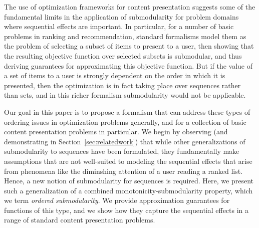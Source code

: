 The use of optimization frameworks for content presentation
suggests some of the fundamental limits in the application of submodularity
for problem domains where sequential effects are important.
In particular, for a number of basic problems in ranking and recommendation,
standard formalisms model them as the problem of selecting
a subset of items to present to a user, then showing that
the resulting objective function over selected subsets is
submodular, and thus deriving guarantees for
approximating this objective function.
But if the value of a set of items to a user is strongly
dependent on the order in which it is presented, 
then the optimization is in fact taking place over sequences rather
than sets, and in this richer formalism submodularity would not
be applicable.

Our goal in this paper is to propose a formalism that can address 
these types of ordering issues in optimization problems generally,
and for a collection of basic content presentation problems in particular.
We begin by observing (and demonstrating in Section~\ref{sec:relatedwork})
that while other generalizations of submodularity to sequences 
have been formulated, they fundamentally make assumptions that are not
well-suited to modeling the sequential effects that arise from
phenomena like the diminshing attention of a user reading a ranked list.
Hence, a new notion of
submodularity for sequences is required. Here, we present such a
generalization of a combined monotonicity-submodularity property,
which we term \emph{ordered submodularity}.
We provide approximation guarantees for functions of this type,
and we show how they capture the sequential effects in a
range of standard content presentation problems.

